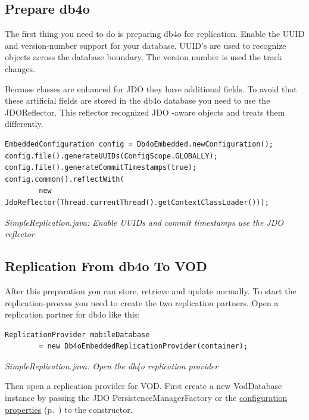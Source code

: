 \subsection{Prepare db4o}
\label{drs:db4o-replication-system-drs-vod-vod-replication:prepare}

The first thing you need to do is preparing db4o for replication. Enable the UUID and version-number support for your database. UUID's are used to recognize objects across the database boundary. The version number is used the track changes.

Because classes are enhanced for JDO they have additional fields. To avoid that these artificial fields are stored in the db4o database you need to use the JDOReflector. This reflector recognized JDO -aware objects and treats them differently.

\begin{lstlisting}
EmbeddedConfiguration config = Db4oEmbedded.newConfiguration();
config.file().generateUUIDs(ConfigScope.GLOBALLY);
config.file().generateCommitTimestamps(true);
config.common().reflectWith(
        new JdoReflector(Thread.currentThread().getContextClassLoader()));
\end{lstlisting}

{\small\itshape SimpleReplication.java: Enable UUIDs and commit timestamps use the JDO reflector\par}
\medskip

\subsection{Replication From db4o To VOD}
\label{drs:db4o-replication-system-drs-vod-vod-replication:db4otovod}

After this preparation you can store, retrieve and update normally. To start the replication-process you need to create the two replication partners. Open a replication partner for db4o like this:

\begin{lstlisting}
ReplicationProvider mobileDatabase
        = new Db4oEmbeddedReplicationProvider(container);
\end{lstlisting}

{\small\itshape SimpleReplication.java: Open the db4o replication provider\par}
\medskip

Then open a replication provider for VOD. First create a new VodDatabase instance by passing the JDO PersistenceManagerFactory or the \hyperref[drs:db4o-replication-system-drs-vod-setup]{configuration properties} (p.~\pageref{drs:db4o-replication-system-drs-vod-setup}) to the constructor.

